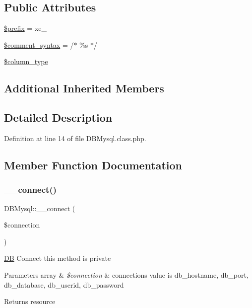 \subsection*{Public Attributes}
\begin{DoxyCompactItemize}
\item 
\hyperlink{classDBMysql_ac95b2047c4c75730e0533be0cccd19d9}{\$prefix} = \textquotesingle{}xe\+\_\+\textquotesingle{}
\item 
\hyperlink{classDBMysql_a2c00f6e29c9e4fc4a532f806cf4313c2}{\$comment\+\_\+syntax} = \textquotesingle{}/$\ast$ \%s $\ast$/\textquotesingle{}
\item 
\hyperlink{classDBMysql_aa93c8f5f14304a16864a0708a3ba41b0}{\$column\+\_\+type}
\end{DoxyCompactItemize}
\subsection*{Additional Inherited Members}


\subsection{Detailed Description}


Definition at line 14 of file D\+B\+Mysql.\+class.\+php.



\subsection{Member Function Documentation}
\hypertarget{classDBMysql_ad11061c47d57c2f346947e0789ecb46b}{}\label{classDBMysql_ad11061c47d57c2f346947e0789ecb46b} 
\subsubsection{\texorpdfstring{\+\_\+\+\_\+connect()}{\_\_connect()}}
{\footnotesize\ttfamily D\+B\+Mysql\+::\+\_\+\+\_\+connect (\begin{DoxyParamCaption}\item[{}]{\$connection }\end{DoxyParamCaption})}

\hyperlink{classDB}{DB} Connect this method is private 
\begin{DoxyParams}[1]{Parameters}
array & {\em \$connection} & connection\textquotesingle{}s value is db\+\_\+hostname, db\+\_\+port, db\+\_\+database, db\+\_\+userid, db\+\_\+password \\
\hline
\end{DoxyParams}
\begin{DoxyReturn}{Returns}
resource 
\end{DoxyReturn}


